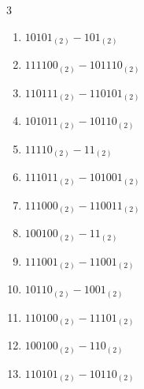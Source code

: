 \begin{multicols}{3}
\begin{enumerate}

  \item $10101_{(2)} - 101_{(2)}$


  \item $111100_{(2)} - 101110_{(2)}$


  \item $110111_{(2)} - 110101_{(2)}$


\columnbreak %

\resetques

  \item $101011_{(2)} - 10110_{(2)}$


  \item $11110_{(2)} - 11_{(2)}$


  \item $111011_{(2)} - 101001_{(2)}$


  \item $111000_{(2)} - 110011_{(2)}$


  \item $100100_{(2)} - 11_{(2)}$


  \item $111001_{(2)} - 11001_{(2)}$


  \item $10110_{(2)} - 1001_{(2)}$


  \item $110100_{(2)} - 11101_{(2)}$


  \item $100100_{(2)} - 110_{(2)}$


  \item $110101_{(2)} - 10110_{(2)}$



\end{enumerate}
\end{multicols}
